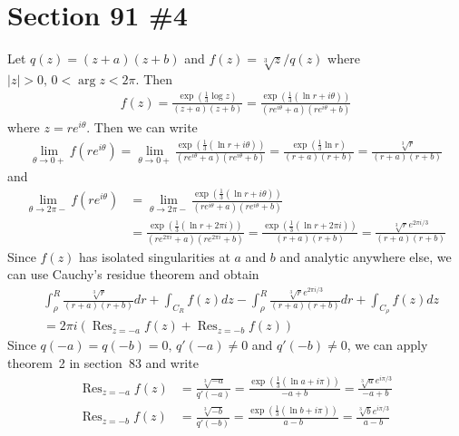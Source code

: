 \documentclass{scrartcl}
\DeclareMathOperator*{\Res}{Res}
\begin{document}
\section{Section 91 \#4}
Let \(q(z) = (z + a)(z + b)\) and \(f(z) = \sqrt[3]{z} / q(z)\) where \(|z| > 0,\, 0 < \arg z < 2\pi\).
Then
\begin{align*}
  f(z)
  = \frac{\exp \left( \frac{1}{3} \log z \right)}{(z + a)(z + b)}
  = \frac{\exp \left( \frac{1}{3} (\ln r + i\theta) \right)}{(re^{i\theta} + a)(re^{i\theta} + b)}
\end{align*}
where \(z = re^{i\theta}\).
Then we can write
\begin{align*}
  \lim_{\theta \to 0+} f(re^{i\theta})
  = \lim_{\theta \to 0+} \frac{\exp \left( \frac{1}{3} (\ln r + i\theta) \right)}{(re^{i\theta} + a)(re^{i\theta} + b)}
  = \frac{\exp \left( \frac{1}{3} \ln r \right)}{(r + a)(r + b)}
  = \frac{\sqrt[3]{r}}{(r + a)(r + b)}
\end{align*}
and
\begin{align*}
  \lim_{\theta \to 2\pi-} f(re^{i\theta})
  &= \lim_{\theta \to 2\pi-} \frac{\exp \left( \frac{1}{3} (\ln r + i\theta) \right)}{(re^{i\theta} + a)(re^{i\theta} + b)} \\
  &= \frac{\exp \left( \frac{1}{3} (\ln r + 2\pi i) \right)}{(re^{2\pi i} + a)(re^{2\pi i} + b)}
  = \frac{\exp \left( \frac{1}{3} (\ln r + 2\pi i) \right)}{(r + a)(r + b)}
  = \frac{\sqrt[3]{r} e^{2\pi i / 3}}{(r + a)(r + b)}
\end{align*}
Since \(f(z)\) has isolated singularities at \(a\) and \(b\) and analytic anywhere else, we can use Cauchy's residue theorem and obtain
\begin{align}
  \nonumber &\int^R_\rho \frac{\sqrt[3]{r}}{(r + a)(r + b)} dr + \int_{C_R} f(z) dz - \int^R_\rho \frac{\sqrt[3]{r} e^{2\pi i / 3}}{(r + a)(r + b)} dr + \int_{C_\rho} f(z) dz \\
  \label{sec5_cauchy} &= 2\pi i \left( \Res_{z = -a} f(z) + \Res_{z = -b} f(z) \right)
\end{align}
Since \(q(-a) = q(-b) = 0,\, q'(-a) \not = 0\) and \(q'(-b) \not = 0\), we can apply theorem~2 in section~83 and write
\begin{align*}
  \Res_{z = -a} f(z)
  &= \frac{\sqrt[3]{-a}}{q'(-a)}
  = \frac{\exp \left( \frac{1}{3} (\ln a + i\pi) \right)}{-a + b}
  = \frac{\sqrt[3]{a} e^{i\pi / 3}}{-a + b} \\
  \Res_{z = -b} f(z)
  &= \frac{\sqrt[3]{-b}}{q'(-b)}
  = \frac{\exp \left( \frac{1}{3} (\ln b + i\pi) \right)}{a - b}
  = \frac{\sqrt[3]{b} e^{i\pi / 3}}{a - b}
\end{align*}
\end{document}
